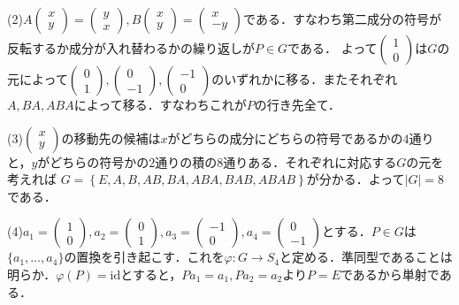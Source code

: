 \documentclass[
		book,
		head_space=20mm,
		foot_space=20mm,
		gutter=10mm,
		line_length=190mm
]{jlreq}
\begin{document}
    (2)$A\begin{pmatrix}
        x\\
        y
    \end{pmatrix}=\begin{pmatrix}
        y\\
        x
    \end{pmatrix},B\begin{pmatrix}
        x\\
        y
    \end{pmatrix}=\begin{pmatrix}
        x\\
        -y
    \end{pmatrix}$である．すなわち第二成分の符号が反転するか成分が入れ替わるかの繰り返しが$P\in G$である．
    よって$\begin{pmatrix}
        1\\
        0
    \end{pmatrix}$は$G$の元によって$\begin{pmatrix}
        0\\
        1\end{pmatrix},\begin{pmatrix}
        0\\
        -1
    \end{pmatrix},\begin{pmatrix}
        -1\\
        0
    \end{pmatrix}$のいずれかに移る．またそれぞれ$A,BA,ABA$によって移る．すなわちこれが$P$の行き先全て．

    (3)$\begin{pmatrix}
        x \\ 
        y
        \end{pmatrix}$の移動先の候補は$x$がどちらの成分にどちらの符号であるかの$4$通りと，$y$がどちらの符号かの$2$通りの積の$8$通りある．それぞれに対応する$G$の元を考えれば
        $G=\left\{ E,A,B,AB,BA,ABA,BAB,ABAB \right\}$が分かる．よって$|G|=8$である．
       
    (4)$a_1=\begin{pmatrix}
        1 \\
        0
    \end{pmatrix},a_2=\begin{pmatrix}
        0 \\
        1
    \end{pmatrix},a_3=\begin{pmatrix}
        -1 \\
        0
    \end{pmatrix},a_4=\begin{pmatrix}
        0 \\
        -1
        \end{pmatrix}$とする．$P \in G$は$\{ a_1,\dots,a_4\}$の置換を引き起こす．これを$\varphi\colon G \rightarrow S_4$と定める．準同型であることは明らか．$\varphi(P)=\mathrm{id}$とすると，$Pa_1=a_1,Pa_2=a_2$より$P=E$であるから単射である．
\end{document}
